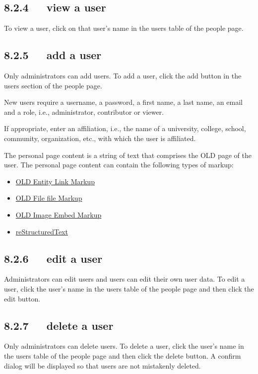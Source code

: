 \documentclass[letterpaper,10pt,english]{sphinxmanual}
\begin{document}
\subsection{8.2.4   view a user}
\label{user_guide:view-a-user}
To view a user, click on that user's name in the users table of the people page.


\subsection{8.2.5   add a user}
\label{user_guide:add-a-user}
Only administrators can add users.  To add a user, click the add button in the
users section of the people page.

New users require a username, a password, a first name, a last name, an email
and a role, i.e., administrator, contributor or viewer.

If appropriate, enter an affiliation, i.e., the name of a university, college,
school, community, organization, etc., with which the user is affiliated.

The personal page content is a string of text that comprises the OLD page of the
user.  The personal page content can contain the following types of markup:
\begin{itemize}
\item {} 
{\hyperref[user_guide:old-entity-link-markup]{OLD Entity Link Markup}}

\item {} 
{\hyperref[user_guide:old-file-file-markup]{OLD File file Markup}}

\item {} 
{\hyperref[user_guide:old-image-embed-markup]{OLD Image Embed Markup}}

\item {} 
{\hyperref[user_guide:restructuredtext]{reStructuredText}}

\end{itemize}


\subsection{8.2.6   edit a user}
\label{user_guide:edit-a-user}
Administrators can edit users and users can edit their own user data.  To edit
a user, click the user's name in the users table of the people page and then
click the edit button.


\subsection{8.2.7   delete a user}
\label{user_guide:delete-a-user}
Only administrators can delete users.  To delete a user, click the user's name
in the users table of the people page and then click the delete button.  A
confirm dialog will be displayed so that users are not mistakenly deleted.
\end{document}

